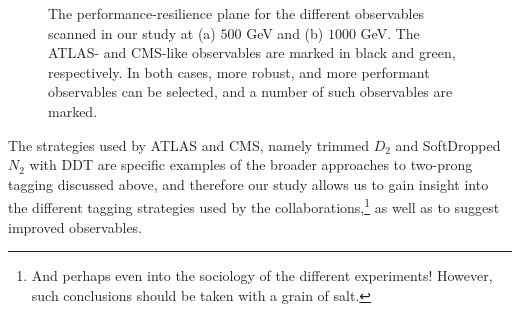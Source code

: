 \documentclass[11pt]{cernrep}
\begin{document}
\begin{figure}
\begin{center}
\qquad
{}
\end{center}
\caption{The performance-resilience plane for the different observables scanned in our study at (a) $500$ GeV and (b) $1000$ GeV. The ATLAS- and CMS-like observables are marked in black and green, respectively. In both cases, more robust, and more performant observables can be selected, and a number of such observables are marked.
}
\label{jetsub_2prong_fig:phasespace}
\end{figure}

The strategies used by ATLAS and CMS, namely trimmed $D_2$ \cite{Larkoski:2015kga,Larkoski:2014gra} and SoftDropped $N_2$ \cite{Moult:2016cvt} with DDT \cite{Dolen:2016kst} are specific examples of the broader approaches to two-prong tagging discussed above, and therefore our study allows us to gain insight into the different tagging strategies used by the collaborations,\footnote{And perhaps even into the sociology of the different experiments! However, such conclusions should be taken with a grain of salt.} as well as to suggest improved observables.
\end{document}
